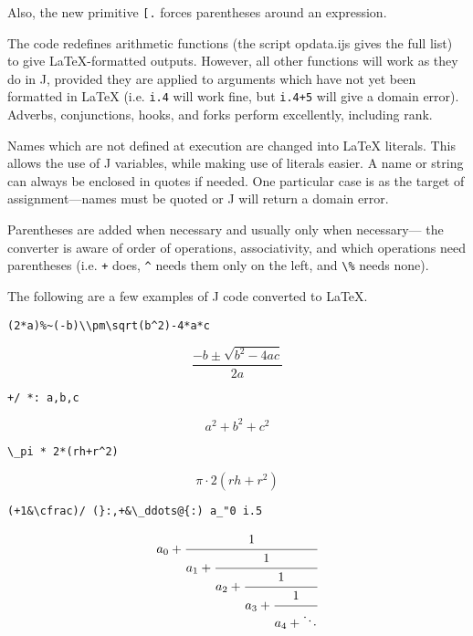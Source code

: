 \documentclass{article}
\newcommand{\code}[1]{\lstinline`#1`}
\begin{document}
Also, the new primitive \code{[.} forces parentheses around an expression.

The code redefines arithmetic functions (the script opdata.ijs gives the
full list) to give LaTeX-formatted outputs.
However, all other functions will work as they do in J, provided they are
applied to arguments which have not yet been formatted in LaTeX
(i.e. \code{i.4} will work fine, but \code{i.4+5} will give a domain
error).
Adverbs, conjunctions, hooks, and forks perform excellently, including
rank.

Names which are not defined at execution are changed into LaTeX literals.
This allows the use of J variables, while making use of literals easier. 
A name or string can always be enclosed in quotes if needed.
One particular case is as the target of assignment---names must be quoted
or J will return a domain error.

Parentheses are added when necessary and usually only when necessary---
the converter is aware of order of operations, associativity, and which
operations need parentheses (i.e. \code{+} does, \code{^} needs them
only on the left, and \code{\%} needs none).

The following are a few examples of J code converted to LaTeX.
\begin{lstlisting}
(2*a)%~(-b)\\pm\sqrt(b^2)-4*a*c
\end{lstlisting}
\[\frac{-b \pm \sqrt{b^2-4 a c}}{2 a}\]
\begin{lstlisting}
+/ *: a,b,c
\end{lstlisting}
\[a^2+b^2+c^2\]
\begin{lstlisting}
\_pi * 2*(rh+r^2)
\end{lstlisting}
\[\pi\cdot 2 (rh+r^2)\]
\begin{lstlisting}
(+1&\cfrac)/ (}:,+&\_ddots@{:) a_"0 i.5
\end{lstlisting}
\[a_0+\cfrac{1}{a_1+\cfrac{1}{a_2+\cfrac{1}{a_3+\cfrac{1}{a_4+\ddots}}}}\]
\end{document}
